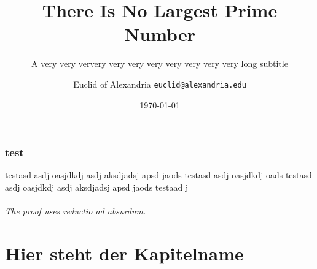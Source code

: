\documentclass[aspectratio=169]{beamer}
\title{There Is No Largest Prime Number}
\subtitle{A very very ververy very very very very very very very long subtitle}
\date{\today}
\author[Euclid]{Euclid of Alexandria \texttt{euclid@alexandria.edu}}
\begin{document}
	

\begin{frame}
\titlepage
\end{frame}

\section{test}

\begin{frame}{testasd asdj oasjdkdj asdj aksdjadsj apsd jaods testasd asdj oasjdkdj oads testasd asdj oasjdkdj asdj aksdjadsj apsd jaods testaad j}
	
	\framesubtitle{The proof uses \textit{reductio ad absurdum}.} 
	\blindtext
\end{frame}

\part{Hier steht der Kapitelname}
\end{document}
